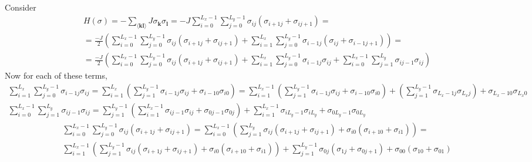 \documentclass[10pt]{amsart}
\begin{document}
\begin{multicols*}{2}
Consider 
\[
\begin{gathered}
H(\sigma) = -\sum_{ \langle \mathbf{k} \mathbf{l} \rangle } J \sigma_{\mathbf{k}} \sigma_{\mathbf{l}} =  -J \sum_{i=0}^{L_x-1} \sum_{j=0}^{L_y-1} \sigma_{ij}( \sigma_{i+1j} + \sigma_{ij+1} ) = \\	
= \frac{-J}{2} \left( \sum_{i=0}^{L_x-1} \sum_{j=0}^{L_y-1} \sigma_{ij} (\sigma_{i+1 j} + \sigma_{ij+1} ) + \sum_{i=1}^{L_x} \sum_{j=0}^{L_y-1}   \sigma_{i-1j} (\sigma_{ij} + \sigma_{i-1 j+1} ) \right) = \\
	= \frac{-J}{2} \left( \sum_{i=0}^{L_x-1} \sum_{j=0}^{L_y-1} \sigma_{ij} (\sigma_{i+1 j} + \sigma_{ij+1} ) + \sum_{i=1}^{L_x} \sum_{j=0}^{L_y-1}   \sigma_{i-1j} \sigma_{ij} + \sum_{i=0}^{L_x-1} \sum_{j=1}^{L_y} \sigma_{i j-1} \sigma_{ij} \right) 
\end{gathered}
\]
Now for each of these terms, 
\[
\begin{gathered}
	\sum_{i=1}^{L_x} \sum_{j=0}^{L_y-1} \sigma_{i-1 j} \sigma_{ij} = \sum_{i=1}^{L_x} \left( \sum_{j=1}^{ L_y-1 } \sigma_{i-1 j} \sigma_{ij} + \sigma_{i-1 0 }\sigma_{i0} \right) = \sum_{i=1}^{L_x-1} \left( \sum_{j=1}^{L_y-1} \sigma_{i-1 j} \sigma_{ij} + \sigma_{i-10} \sigma_{i0} \right) + \left( \sum_{j=1}^{L_y-1} \sigma_{L_x-1 j } \sigma_{L_xj} \right) + \sigma_{L_x-1 0 } \sigma_{L_x0}   \\ 
\sum_{i=0}^{L_x-1} \sum_{j=1}^{L_y} \sigma_{ij-1} \sigma_{ij} = \sum_{j=1}^{L_y-1} \left( \sum_{i=1}^{L_x-1} \sigma_{ij-1} \sigma_{ij}+ \sigma_{0j-1} \sigma_{0j} \right)  + \sum_{i=1}^{L_x-1} \sigma_{i L_y-1} \sigma_{iL_y} + \sigma_{0L_y-1} \sigma_{0L_y} 
\end{gathered}
\]
\[
\begin{gathered}
	\sum_{i=0}^{L_x-1} \sum_{j=0}^{L_y-1} \sigma_{ij} (\sigma_{i+1j } + \sigma_{ij+1} ) = \sum_{i=0}^{L_x-1} \left( \sum_{j=1}^{L_y} \sigma_{ij} ( \sigma_{i+1j } + \sigma_{ij+1} ) + \sigma_{i0} (\sigma_{i+1 0 } + \sigma_{i1} ) \right) = \\
	\sum_{i=1}^{L_x-1} \left( \sum_{j=1}^{L_y-1} \sigma_{ij} (\sigma_{i+1j}  + \sigma_{ij+1}) + \sigma_{i0} (\sigma_{i+1 0 } + \sigma_{i1}) \right) + \sum_{j=1}^{L_y-1} \sigma_{0j} (\sigma_{1j} + \sigma_{0j+1} ) + \sigma_{00} (\sigma_{10} + \sigma_{01} )
\end{gathered}
\]


\end{multicols*}
\end{document}
